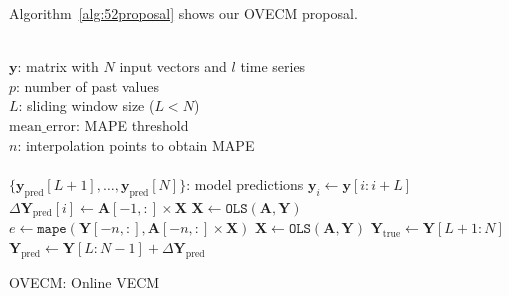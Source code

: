 Algorithm~\ref{alg:52proposal} shows our OVECM proposal.
\begin{algorithm}[!htp]
\begin{algorithmic}[1]
\REQUIRE $\,$ \\
$\mathbf{y}$: matrix with $N$ input vectors and $l$ time series\\
$p$: number of past values \\
$L$: sliding window size ($L<N$) \\
$\text{mean\_error}$: MAPE threshold \\
$n$: interpolation points to obtain MAPE \\
\ENSURE  $\,$ \\
$\{\mathbf{y}_{\text{pred}}[L+1],\dots,\mathbf{y}_{\text{pred}}[N]\}$: model predictions 
    \STATE $\mathbf{y}_i \gets \mathbf{y}[i:i+L]$
	\ELSE
        \STATE $\Delta \mathbf{Y}_{\text{pred}}[i] \gets \mathbf{A}[-1,:] \times \mathbf{X}$
    \ENDIF
    \STATE $\mathbf{X} \gets \texttt{OLS} (\mathbf{A},\mathbf{Y})$
    \STATE $e \gets \texttt{mape}(\mathbf{Y}[-n,:],\mathbf{A}[-n,:] \times \mathbf{X})$
        \STATE $\mathbf{X} \gets \texttt{OLS} (\mathbf{A},\mathbf{Y})$
    \ENDIF
\ENDFOR
\STATE $\mathbf{Y}_{\text{true}} \gets \mathbf{Y}[L+1:N]$
\STATE $\mathbf{Y}_{\text{pred}}\gets 
\mathbf{Y}[L:N-1] +\Delta \mathbf{Y}_{\text{pred}}$
\end{algorithmic}
\caption{OVECM: Online VECM}
\label{alg:52proposal}
\end{algorithm}

